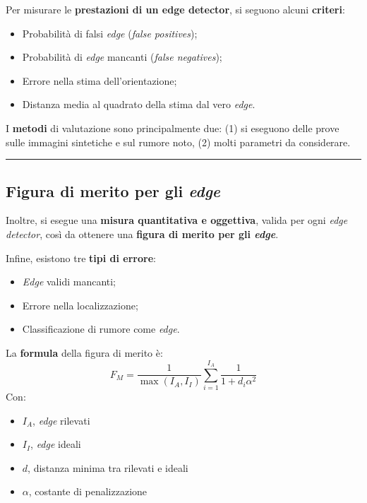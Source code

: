 \documentclass[a4paper]{article}
\newcommand{\longline}{\noindent\rule{\textwidth}{0.4pt}}
\begin{document}
	Per misurare le \textcolor{Red3}{\textbf{prestazioni di un edge detector}}, si seguono alcuni \textbf{criteri}:
	\begin{itemize}
		\item Probabilità di falsi \emph{edge} (\emph{false positives});
		\item Probabilità di \emph{edge} mancanti (\emph{false negatives});
		\item Errore nella stima dell'orientazione;
		\item Distanza media al quadrato della stima dal vero \emph{edge}.
	\end{itemize}
	I \textbf{metodi} di valutazione sono principalmente due: (1) si eseguono delle prove sulle immagini sintetiche e sul rumore noto, (2) molti parametri da considerare.
	
	\longline
	
	\subsection{Figura di merito per gli \emph{edge}}
	
	Inoltre, si esegue una \textbf{misura quantitativa e oggettiva}, valida per ogni \emph{edge detector}, così da ottenere una \textcolor{Red3}{\textbf{figura di merito per gli \emph{edge}}}.\newline
	
	\noindent
	Infine, esistono tre \textbf{tipi di errore}:
	\begin{itemize}
		\item \emph{Edge} validi mancanti;
		\item Errore nella localizzazione;
		\item Classificazione di rumore come \emph{edge}.
	\end{itemize}
	La \textbf{formula} della figura di merito è:
	\begin{equation*}
		F_{M} = \dfrac{1}{\max\left(I_{A}, I_{I}\right)} \sum_{i=1}^{I_{A}}\dfrac{1}{1+d_{i}\alpha^{2}}
	\end{equation*}
	Con:
	\begin{itemize}[label=-]
		\item $I_{A}$, \emph{edge} rilevati
		\item $I_{I}$, \emph{edge} ideali
		\item $d$, distanza minima tra rilevati e ideali
		\item $\alpha$, costante di penalizzazione
	\end{itemize}\newpage
\end{document}
